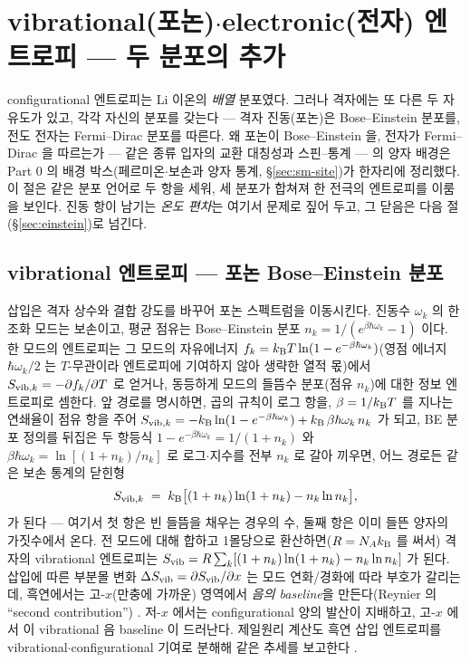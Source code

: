 \section{vibrational(포논)$\cdot$electronic(전자) 엔트로피 --- 두 분포의 추가}\label{sec:vibel}

configurational 엔트로피는 Li 이온의 \emph{배열} 분포였다. 그러나 격자에는 또 다른 두 자유도가 있고, 각각
자신의 분포를 갖는다 --- 격자 진동(포논)은 Bose--Einstein 분포를, 전도 전자는 Fermi--Dirac 분포를 따른다.
왜 포논이 Bose--Einstein 을, 전자가 Fermi--Dirac 을 따르는가 --- 같은 종류 입자의 교환 대칭성과
스핀--통계 --- 의 양자 배경은 Part 0 의 배경 박스(페르미온$\cdot$보손과 양자 통계, \S\ref{sec:sm-site})가 한자리에 정리했다.
이 절은 같은 분포 언어로 두 항을 세워, 세 분포가 합쳐져 한 전극의 엔트로피를 이룸을 보인다. 진동 항이
남기는 \emph{온도 편차}는 여기서 문제로 짚어 두고, 그 닫음은 다음 절(\S\ref{sec:einstein})로 넘긴다.

\subsection{vibrational 엔트로피 --- 포논 Bose--Einstein 분포}\label{ssec:vib}
삽입은 격자 상수와 결합 강도를 바꾸어 포논 스펙트럼을 이동시킨다. 진동수 $\omega_k$ 의 한 조화 모드는
보손이고, 평균 점유는 Bose--Einstein 분포 $n_k=1/(e^{\beta\hbar\omega_k}-1)$ 이다. 한 모드의 엔트로피는 그
모드의 자유에너지 $f_k=k_{\mathrm B} T\ln(1-e^{-\beta\hbar\omega_k})$(영점 에너지 $\hbar\omega_k/2$ 는 $T$-무관이라
엔트로피에 기여하지 않아 생략한 열적 몫)에서 $S_{\mathrm{vib},k}=-\partial f_k/\partial T$ 로 얻거나,
동등하게 모드의 들뜸수 분포(점유 $n_k$)에 대한 정보 엔트로피로 셈한다. 앞 경로를 명시하면, 곱의 규칙이
로그 항을, $\beta=1/k_{\mathrm B} T$ 를 지나는 연쇄율이 점유 항을 주어
$S_{\mathrm{vib},k}=-k_{\mathrm B}\ln(1-e^{-\beta\hbar\omega_k})+k_{\mathrm B}\,\beta\hbar\omega_k\,n_k$ 가 되고, BE 분포 정의를 뒤집은 두
항등식 $1-e^{-\beta\hbar\omega_k}=1/(1+n_k)$ 와 $\beta\hbar\omega_k=\ln[(1+n_k)/n_k]$ 로 로그$\cdot$지수를 전부
$n_k$ 로 갈아 끼우면, 어느 경로든 같은 보손 통계의 닫힌형
\begin{equation}
S_{\mathrm{vib},k} \;=\; k_{\mathrm B}\bigl[(1+n_k)\ln(1+n_k) - n_k\ln n_k\bigr],
\label{eq:Svib_mode}
\end{equation}
가 된다 --- 여기서 첫 항은 빈 들뜸을 채우는 경우의 수, 둘째 항은 이미 들뜬 양자의 가짓수에서 온다. 전
모드에 대해 합하고 1몰당으로 환산하면($R=N_Ak_{\mathrm B}$ 를 써서) 격자의 vibrational 엔트로피는
$S_{\mathrm{vib}}=R\sum_k[(1+n_k)\ln(1+n_k)-n_k\ln n_k]$ 가 된다. 삽입에 따른 부분몰 변화 $\Delta S_{\mathrm{vib}}=\partial
S_{\mathrm{vib}}/\partial x$ 는 모드 연화/경화에 따라 부호가 갈리는데, 흑연에서는 고-$x$(만충에 가까운) 영역에서
\emph{음의 baseline}을 만든다(Reynier 의 ``second contribution'') \cite{reynier2003}. 저-$x$ 에서는
configurational 양의 발산이 지배하고, 고-$x$ 에서 이 vibrational 음 baseline 이 드러난다. 제일원리 계산도
흑연 삽입 엔트로피를 vibrational$\cdot$configurational 기여로 분해해 같은 추세를 보고한다 \cite{jpcc2021}.

